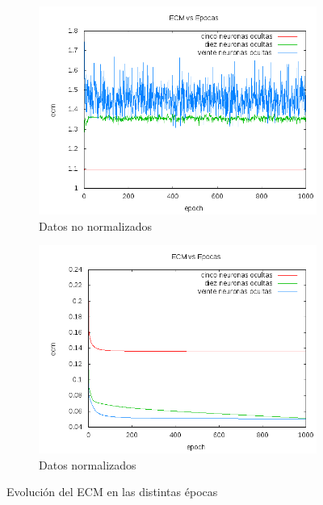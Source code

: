 \documentclass[12pt]{article}
\begin{document}
\begin{figure}[!ht]
\centering
    \begin{subfigure}[b]{0.5\textwidth}            
            \centering
            \includegraphics[width=\textwidth]{recursos/ecm_pr4}
            \caption{Datos no normalizados}
            \label{fig:ecm_pr4}
    \end{subfigure}%
    \begin{subfigure}[b]{0.5\textwidth}
            \centering
            \includegraphics[width=\textwidth]{recursos/ecm_pr4_norm}
            \caption{Datos normalizados}
            \label{fig:ecm_pr4_norm}
    \end{subfigure}
    \caption{Evoluci\'on del ECM en las distintas \'epocas}
  \label{fig:ecm_vsnorm}
\end{figure}
\end{document}

